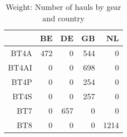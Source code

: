\begin{table}[ht]
\centering
\begin{tabular}{rrrrr}
  \hline
 & BE & DE & GB & NL \\ 
  \hline
BT4A & 472 & 0 & 544 & 0 \\ 
  BT4AI & 0 & 0 & 698 & 0 \\ 
  BT4P & 0 & 0 & 254 & 0 \\ 
  BT4S & 0 & 0 & 257 & 0 \\ 
  BT7 & 0 & 657 & 0 & 0 \\ 
  BT8 & 0 & 0 & 0 & 1214 \\ 
   \hline
\end{tabular}
\caption{Weight: Number of hauls by gear and country} 
\end{table}
